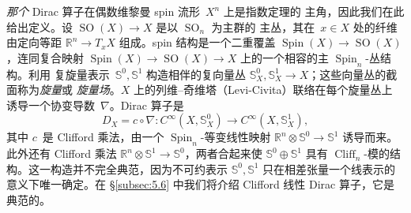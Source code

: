 \documentclass[11pt]{amsart}
\theoremstyle{definition}
\theoremstyle{remark}
\theoremstyle{plain}
\numberwithin{equation}{section}
\renewcommand{\:}{\colon}
\newcommand{\RR}{{\mathbb R}}
\DeclareMathOperator{\Spin}{Spin}
\newcommand{\ZZ}{{\mathbb Z}}
\DeclareMathOperator{\coker}{coker}
\DeclareMathOperator{\SO}{SO}
\DeclareMathOperator{\Cliff}{Cliff}
\renewcommand{\SS}{\mathbb{S}}
\begin{document}

\emph{那个} Dirac 算子在偶数维黎曼 spin 流形~$X^n$ 上是指数定理的
主角，因此我们在此给出定义。设 $\SO(X)\to X$ 是以 $\SO_n$ 为主群的
主丛，其在~$x\in X$ 处的纤维由定向等距 $\RR^n\to T_xX$ 组成。spin
结构是一个二重覆盖 $\Spin(X)\to\SO(X)$，连同复合映射
$\Spin(X)\to\SO(X)\to X$ 上的一个相容的主 $\Spin_n$-丛结构。利用
复旋量表示~$\SS^0,\SS^1$ 构造相伴的复向量丛
$\SS^{0}_X,\SS^{1}_X\to X$；这些向量丛的截面称为\emph{旋量}或
\emph{旋量场}。$X$ 上的列维–奇维塔（Levi-Civita）联络在每个旋量丛上
诱导一个协变导数~$\nabla $。Dirac 算子是
  \begin{equation}\label{eq:41}
     D_X = c\circ \nabla \:C^{\infty}(X,\SS^0_X)\longrightarrow
     C^{\infty}(X,\SS^1_X),  
  \end{equation}
其中 $c$~是 Clifford 乘法，由一个 $\Spin_n$-等变线性映射
$\RR^n\otimes \SS^{0}\to\SS^{1}$ 诱导而来。此外还有 Clifford 乘法
$\RR^n\otimes \SS^1\to \SS^0$，两者合起来使 $\SS^0\oplus \SS^1$ 具有
$\Cliff_n$-模的结构。这一构造并不完全典范，因为不可约表示
$\SS^0,\SS^1$ 只在相差张量一个线表示的意义下唯一确定。在
§\ref{subsec:5.6} 中我们将介绍 Clifford 线性 Dirac 算子，它是典范的。
\end{document}
